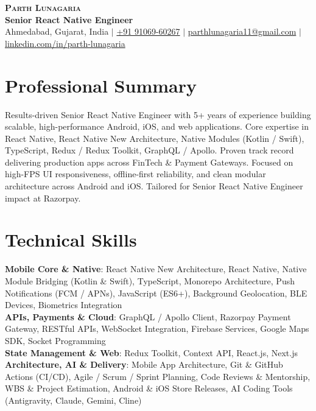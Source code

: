\documentclass[letterpaper,10.5pt]{article}
\begin{document}
\begin{center}
  {\Huge \scshape \textbf{\color{accentColor}Parth Lunagaria}} \\ \vspace{3pt}
  {\small \textbf{Senior React Native Engineer}} \\ \vspace{3pt}
  \small
  Ahmedabad, Gujarat, India $|$
  \href{tel:+919106960267}{+91 91069-60267} $|$
  \href{mailto:parthlunagaria11@gmail.com}{parthlunagaria11@gmail.com} $|$
  \href{https://www.linkedin.com/in/parth-lunagaria}{linkedin.com/in/parth-lunagaria}
\end{center}
\vspace{-10pt}

\section{Professional Summary}
\small{Results-driven Senior React Native Engineer with 5+ years of experience building scalable, high-performance Android, iOS, and web applications. Core expertise in React Native, React Native New Architecture, Native Modules (Kotlin / Swift), TypeScript, Redux / Redux Toolkit, GraphQL / Apollo. Proven track record delivering production apps across FinTech \& Payment Gateways. Focused on high-FPS UI responsiveness, offline-first reliability, and clean modular architecture across Android and iOS. Tailored for Senior React Native Engineer impact at Razorpay.}
\vspace{-4pt}

\section{Technical Skills}
\begin{itemize}[leftmargin=0.0in, label={}]
  \small{\item{
  \textbf{Mobile Core \& Native}: React Native New Architecture, React Native, Native Module Bridging (Kotlin \& Swift), TypeScript, Monorepo Architecture, Push Notifications (FCM / APNs), JavaScript (ES6+), Background Geolocation, BLE Devices, Biometrics Integration \\
  \textbf{APIs, Payments \& Cloud}: GraphQL / Apollo Client, Razorpay Payment Gateway, RESTful APIs, WebSocket Integration, Firebase Services, Google Maps SDK, Socket Programming \\
  \textbf{State Management \& Web}: Redux Toolkit, Context API, React.js, Next.js \\
  \textbf{Architecture, AI \& Delivery}: Mobile App Architecture, Git \& GitHub Actions (CI/CD), Agile / Scrum / Sprint Planning, Code Reviews \& Mentorship, WBS \& Project Estimation, Android \& iOS Store Releases, AI Coding Tools (Antigravity, Claude, Gemini, Cline)
  }}
\end{itemize}
\vspace{-10pt}
\end{document}
